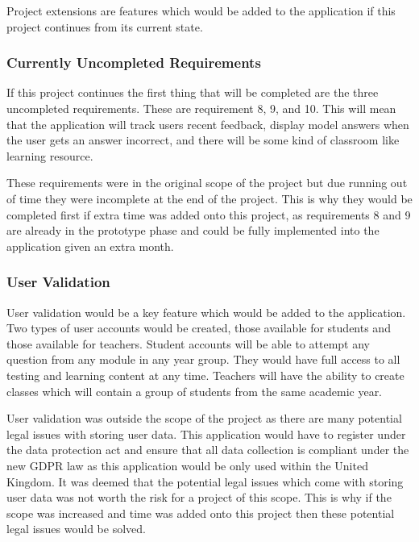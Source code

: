 \documentclass{article}
\begin{document}
Project extensions are features which would be added to the application if this project continues from its current state. 

\subsubsection{Currently Uncompleted Requirements}

If this project continues the first thing that will be completed are the three uncompleted requirements. These are requirement 8, 9, and 10. This will mean that the application will track users recent feedback, display model answers when the user gets an answer incorrect, and there will be some kind of classroom like learning resource. \par

These requirements were in the original scope of the project but due running out of time they were incomplete at the end of the project. This is why they would be completed first if extra time was added onto this project, as requirements 8 and 9 are already in the prototype phase and could be fully implemented into the application given an extra month. 

\subsubsection{User Validation}

User validation would be a key feature which would be added to the application. Two types of user accounts would be created, those available for students and those available for teachers. Student accounts will be able to attempt any question from any module in any year group. They would have full access to all testing and learning content at any time. Teachers will have the ability to create classes which will contain a group of students from the same academic year. \par

User validation was outside the scope of the project as there are many potential legal issues with storing user data. This application would have to register under the data protection act and ensure that all data collection is compliant under the new GDPR law as this application would be only used within the United Kingdom. It was deemed that the potential legal issues which come with storing user data was not worth the risk for a project of this scope. This is why if the scope was increased and time was added onto this project then these potential legal issues would be solved. \par
\end{document}
